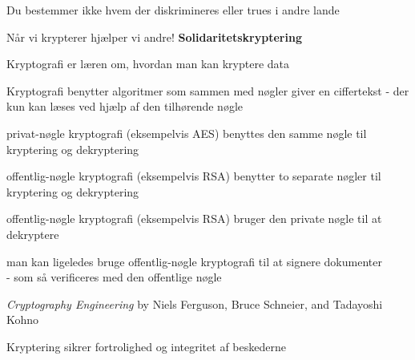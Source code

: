 \documentclass[20pt,landscape,a4paper,footrule]{foils}
\begin{document}
\centerline{Du bestemmer ikke hvem der diskrimineres eller trues i andre lande}

\vskip2cm

Når vi krypterer hjælper vi andre! {\bf Solidaritetskryptering}



\begin{list1}
\item Kryptografi er læren om, hvordan man kan kryptere data
\item Kryptografi benytter algoritmer som sammen med nøgler giver en
  ciffertekst - der kun kan læses ved hjælp af den tilhørende nøgle
\end{list1}



\begin{list1}
\item privat-nøgle kryptografi (eksempelvis AES) benyttes den samme
  nøgle til kryptering og dekryptering
\item offentlig-nøgle kryptografi (eksempelvis RSA) benytter to
  separate nøgler til kryptering og dekryptering
\end{list1}



\begin{list1}
\item offentlig-nøgle kryptografi (eksempelvis RSA) bruger den private
  nøgle til at dekryptere
\item man kan ligeledes bruge offentlig-nøgle kryptografi til at
  signere dokumenter\\ - som så verificeres med den offentlige nøgle
\end{list1}



\emph{Cryptography Engineering} by
Niels Ferguson, Bruce Schneier, and Tadayoshi Kohno

\centerline{Kryptering sikrer fortrolighed og integritet af beskederne}
\end{document}

